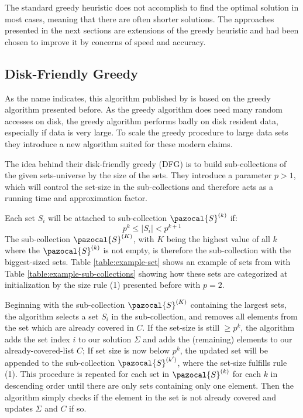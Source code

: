 \documentclass[a4paper]{article}
\newcommand{\Sa}{\pazocal{S}}
\begin{document}
The standard greedy heuristic does not accomplish to find the optimal solution in most cases, meaning that there are often shorter solutions. The approaches presented in the next sections are extensions of the greedy heuristic and had been chosen to improve it by concerns of speed and accuracy. 


\subsection{Disk-Friendly Greedy}
As the name indicates, this algorithm published by \citeauthor*{Cormode} is based on the greedy algorithm presented before. As the greedy algorithm does need many random accesses on disk, the greedy algorithm performs badly on disk resident data, especially if data is very large\cite{Cormode}. To scale the greedy procedure to large data sets they introduce a new algorithm suited for these modern claims.

The idea behind their disk-friendly greedy (DFG) is to build sub-collections of the given sets-universe by the size of the sets. They introduce a parameter $p > 1$, which will control the set-size in the sub-collections and therefore acts as a running time and approximation factor. 

Each set $S_i$ will be attached to sub-collection $\Sa^{(k)}$ if:
\begin{equation}
    p^k \leq |S_i| < p^{k+1}
\end{equation}
The sub-collection $\Sa^{(K)}$, with $K$ being the highest value of all $k$ where the $\Sa^{(k)}$ is not empty, is therefore the sub-collection with the biggest-sized sets. Table \ref{table:example-set} shows an example of sets from \citeauthor{Cormode} with Table \ref{table:example-sub-collections} showing how these sets are categorized at initialization by the size rule (1) presented before with $p = 2$. 

Beginning with the sub-collection $\Sa^{(K)}$ containing the largest sets, the algorithm selects a set $S_i$ in the sub-collection, and removes all elements from the set which are already covered in $C$. If the set-size is still $\geq p^k$, the algorithm adds the set index $i$ to our solution $\Sigma$ and adds the (remaining) elements to our already-covered-list $C$; If set size is now below $p^k$, the updated set will be appended to the sub-collection $\Sa^{(k')}$, where the set-size fulfills rule (1). This procedure is repeated for each set in $\Sa^{(k)}$ for each $k$ in descending order until there are only sets containing only one element. Then the algorithm simply checks if the element in the set is not already covered and updates $\Sigma$ and $C$ if so. 
\end{document}
